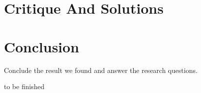 \documentclass[acmtog]{acmart}
\begin{document}
\section{Critique And Solutions}

\section{Conclusion}
Conclude the result we found and answer the research questions.


\begin{acks}
to be finished
\end{acks}






\end{document}
